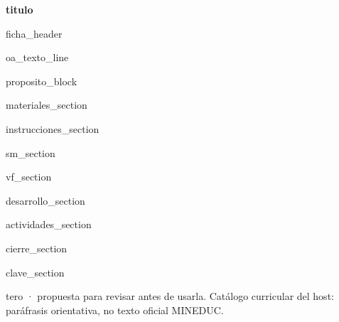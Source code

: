 \documentclass[11pt,a4paper]{article}
\begin{document}
{\LARGE\bfseries {{titulo}}}

\vspace{0.25em}
{{ficha_header}}

\vspace{0.5em}
{{oa_texto_line}}

{{proposito_block}}

{{materiales_section}}

{{instrucciones_section}}

{{sm_section}}

{{vf_section}}

{{desarrollo_section}}

{{actividades_section}}

{{cierre_section}}

{{clave_section}}

\vfill
{\footnotesize tero · propuesta para revisar antes de usarla. Catálogo curricular del host: paráfrasis orientativa, no texto oficial MINEDUC.}
\end{document}
